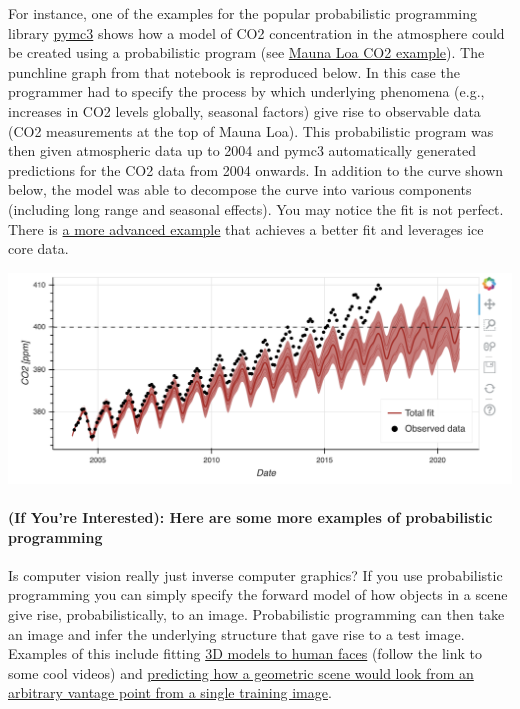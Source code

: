 \documentclass[assignment01_Solutions]{subfiles}
\begin{document}
For instance, one of the examples for the popular probabilistic programming library \href{https://docs.pymc.io/}{pymc3} shows how a model of CO2 concentration in the atmosphere could be created using a probabilistic program (see \href{https://docs.pymc.io/notebooks/GP-MaunaLoa.html}{Mauna Loa CO2 example}).  The punchline graph from that notebook is reproduced below.  In this case the programmer had to specify the process by which underlying phenomena (e.g., increases in CO2 levels globally, seasonal factors) give rise to observable data (CO2 measurements at the top of Mauna Loa).  This probabilistic program was then given atmospheric data up to 2004 and pymc3 automatically generated predictions for the CO2 data from 2004 onwards.  In addition to the curve shown below, the model was able to decompose the curve into various components (including long range and seasonal effects).  You may notice the fit is not perfect.  There is \href{https://docs.pymc.io/notebooks/GP-MaunaLoa2.html}{a more advanced example} that achieves a better fit and leverages ice core data.

\begin{center}
\includegraphics[width=0.8\linewidth]{figures/maunaloa}
\end{center}

\paragraph{(If You're Interested): Here are some more examples of probabilistic programming}
Is computer vision really just inverse computer graphics?  If you use probabilistic programming you can simply specify the forward model of how objects in a scene give rise, probabilistically, to an image. Probabilistic programming can then take an image and infer the underlying structure that gave rise to a test image.  Examples of this include fitting  \href{http://mrkulk.github.io/www_cvpr15/}{3D models to human faces} (follow the link to some cool videos) and \href{https://science.sciencemag.org/content/sci/360/6394/1204.full.pdf}{predicting how a geometric scene would look from an arbitrary vantage point from a single training image}.
\end{document}
